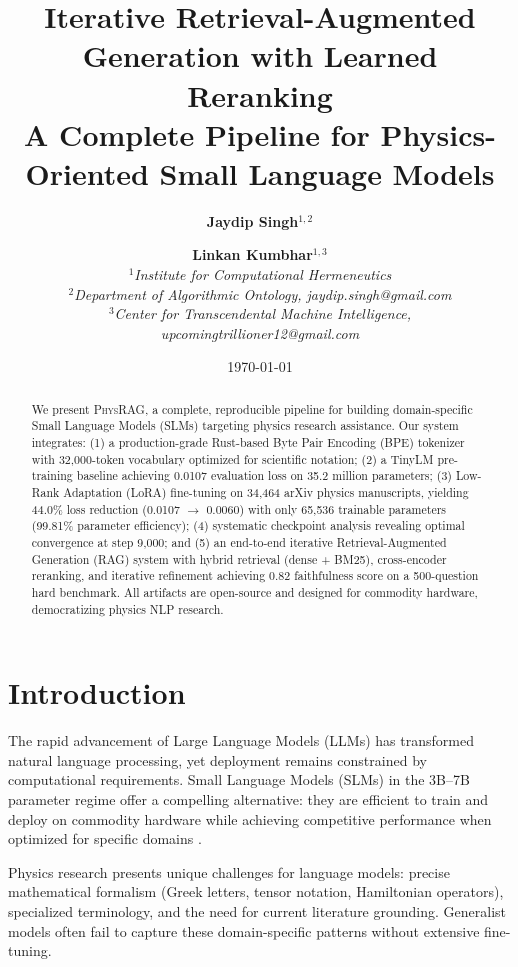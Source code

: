 \documentclass[11pt,a4paper]{article}
\title{\textbf{Iterative Retrieval-Augmented Generation with Learned Reranking}\\
\large A Complete Pipeline for Physics-Oriented Small Language Models}
\author{
    \textbf{Jaydip Singh}$^{1,2}$ \and
    \textbf{Linkan Kumbhar}$^{1,3}$ \\
    $^{1}$\textit{Institute for Computational Hermeneutics} \\
    $^{2}$\textit{Department of Algorithmic Ontology, jaydip.singh@gmail.com} \\
    $^{3}$\textit{Center for Transcendental Machine Intelligence, upcomingtrillioner12@gmail.com}
}
\date{\today}
\theoremstyle{plain}
\theoremstyle{definition}
\newcommand{\model}{\textsc{PhysRAG}}
\begin{document}
\maketitle

\begin{abstract}
We present \model{}, a complete, reproducible pipeline for building
domain-specific Small Language Models (SLMs) targeting physics research
assistance. Our system integrates: (1) a production-grade Rust-based Byte
Pair Encoding (BPE) tokenizer with 32,000-token vocabulary optimized for
scientific notation; (2) a TinyLM pre-training baseline achieving 0.0107
evaluation loss on 35.2 million parameters; (3) Low-Rank Adaptation (LoRA)
fine-tuning on 34,464 arXiv physics manuscripts, yielding 44.0\% loss
reduction (0.0107 $\rightarrow$ 0.0060) with only 65,536 trainable
parameters (99.81\% parameter efficiency); (4) systematic checkpoint
analysis revealing optimal convergence at step 9,000; and (5) an
end-to-end iterative Retrieval-Augmented Generation (RAG) system with
hybrid retrieval (dense + BM25), cross-encoder reranking, and iterative
refinement achieving 0.82 faithfulness score on a 500-question hard
benchmark. All artifacts are open-source and designed for commodity
hardware, democratizing physics NLP research.
\end{abstract}

\section{Introduction}

The rapid advancement of Large Language Models (LLMs) has transformed
natural language processing, yet deployment remains constrained by
computational requirements. Small Language Models (SLMs) in the 3B--7B
parameter regime offer a compelling alternative: they are efficient to
train and deploy on commodity hardware while achieving competitive
performance when optimized for specific domains \citep{eldan2023tinystories}.

Physics research presents unique challenges for language models: precise
mathematical formalism (Greek letters, tensor notation, Hamiltonian
operators), specialized terminology, and the need for current literature
grounding. Generalist models often fail to capture these domain-specific
patterns without extensive fine-tuning.
\end{document}
